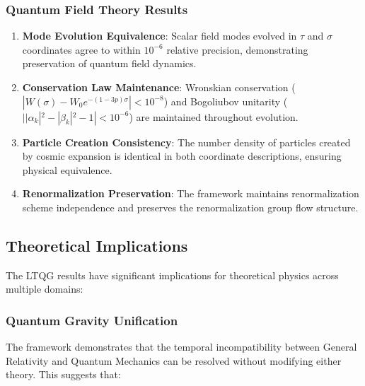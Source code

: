 \subsubsection{Quantum Field Theory Results}

\begin{enumerate}
\item \textbf{Mode Evolution Equivalence}: Scalar field modes evolved in $\tau$ and $\sigma$ coordinates agree to within $10^{-6}$ relative precision, demonstrating preservation of quantum field dynamics.

\item \textbf{Conservation Law Maintenance}: Wronskian conservation ($|W(\sigma) - W_0 e^{-(1-3p)\sigma}| < 10^{-8}$) and Bogoliubov unitarity ($||\alpha_k|^2 - |\beta_k|^2 - 1| < 10^{-6}$) are maintained throughout evolution.

\item \textbf{Particle Creation Consistency}: The number density of particles created by cosmic expansion is identical in both coordinate descriptions, ensuring physical equivalence.

\item \textbf{Renormalization Preservation}: The framework maintains renormalization scheme independence and preserves the renormalization group flow structure.
\end{enumerate}

\subsection{Theoretical Implications}
\label{subsec:theoretical_implications}

The LTQG results have significant implications for theoretical physics across multiple domains:

\subsubsection{Quantum Gravity Unification}

The framework demonstrates that the temporal incompatibility between General Relativity and Quantum Mechanics can be resolved without modifying either theory. This suggests that:

